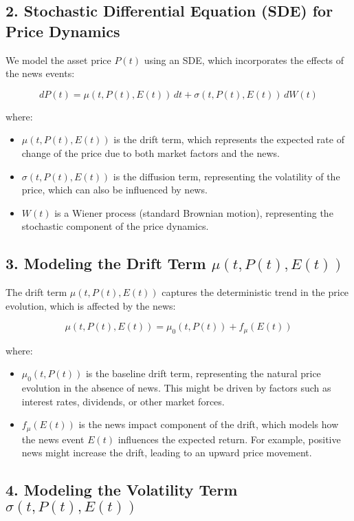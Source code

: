 \documentclass[12pt,article]{memoir}
\begin{document}
\subsection*{2. Stochastic Differential Equation (SDE) for Price Dynamics}

We model the asset price \(P(t)\) using an SDE, which incorporates the effects of the news events:

\[
dP(t) = \mu(t, P(t), E(t)) \, dt + \sigma(t, P(t), E(t)) \, dW(t)
\]

where:
\begin{itemize}
    \item \(\mu(t, P(t), E(t))\) is the drift term, which represents the expected rate of change of the price due to both market factors and the news.
    \item \(\sigma(t, P(t), E(t))\) is the diffusion term, representing the volatility of the price, which can also be influenced by news.
    \item \(W(t)\) is a Wiener process (standard Brownian motion), representing the stochastic component of the price dynamics.
\end{itemize}

\subsection*{3. Modeling the Drift Term \(\mu(t, P(t), E(t))\)}

The drift term \(\mu(t, P(t), E(t))\) captures the deterministic trend in the price evolution, which is affected by the news:

\[
\mu(t, P(t), E(t)) = \mu_0(t, P(t)) + f_{\mu}(E(t))
\]

where:
\begin{itemize}
    \item \(\mu_0(t, P(t))\) is the baseline drift term, representing the natural price evolution in the absence of news. This might be driven by factors such as interest rates, dividends, or other market forces.
    \item \(f_{\mu}(E(t))\) is the news impact component of the drift, which models how the news event \(E(t)\) influences the expected return. For example, positive news might increase the drift, leading to an upward price movement.
\end{itemize}

\subsection*{4. Modeling the Volatility Term \(\sigma(t, P(t), E(t))\)}
\end{document}
